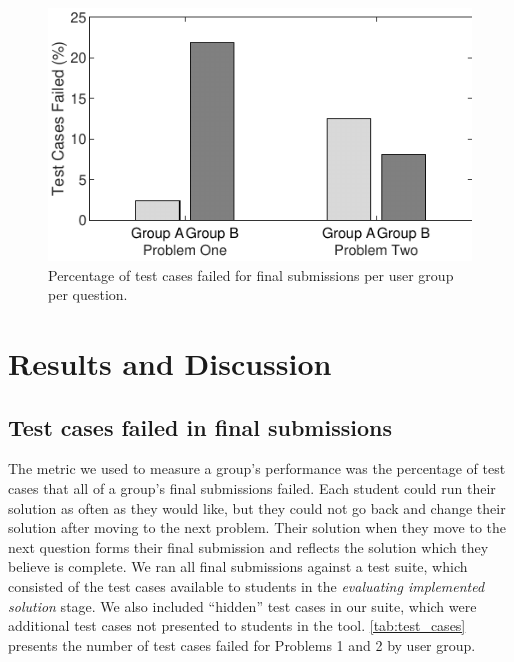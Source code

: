 \documentclass[sigconf,anonymous]{acmart}
\begin{document}
\begin{figure}[h!]
  \centering
  \includegraphics[width=\columnwidth]{test_cases}
  \caption{Percentage of test cases failed for final submissions per user group per question.}
  \label{fig:testcases}
\end{figure}


\section{Results and Discussion} \label{sec:results}
\subsection{Test cases failed in final submissions} \label{sec:results-testcases}
The metric we used to measure a group's performance was the percentage of test cases that all of a group's final submissions failed. Each student could run their solution as often as they would like, but they could not go back and change their solution after moving to the next problem. Their solution when they move to the next question forms their final submission and reflects the solution which they believe is complete. We ran all final submissions against a test suite, which consisted of the test cases available to students in the \emph{evaluating implemented solution} stage. We also included ``hidden'' test cases in our suite, which were additional test cases not presented to students in the tool. \autoref{tab:test_cases} presents the number of test cases failed for Problems 1 and 2 by user group.


\end{document}
